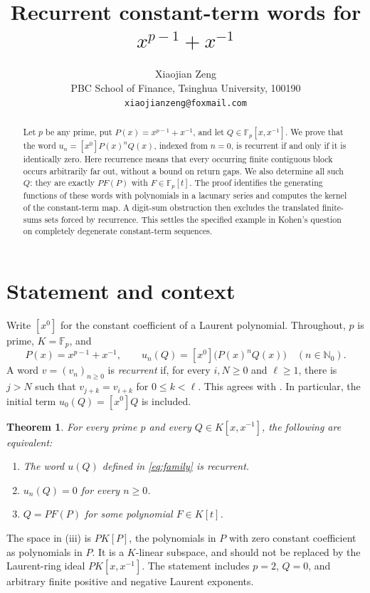 \documentclass[11pt]{article}
\title{Recurrent constant-term words for\\$x^{p-1}+x^{-1}$}
\author{Xiaojian Zeng\\
  \small PBC School of Finance, Tsinghua University, 100190\\
  \small\texttt{xiaojianzeng@foxmail.com}}
\date{}
\newtheorem{theorem}{Theorem}
\theoremstyle{remark}
\newcommand{\Nzero}{\mathbb N_0}
\newcommand{\Fp}{\mathbb F_p}
\begin{document}
\maketitle
\begin{abstract}
Let $p$ be any prime, put $P(x)=x^{p-1}+x^{-1}$, and let
$Q\in\Fp[x,x^{-1}]$. We prove that the word
$u_n=[x^0]P(x)^nQ(x)$, indexed from $n=0$, is recurrent if and only if it
is identically zero. Here recurrence means that every occurring finite
contiguous block occurs arbitrarily far out, without a bound on return gaps.
We also determine all such $Q$: they are exactly $P F(P)$ with
$F\in\Fp[t]$. The proof identifies the generating functions of these words
with polynomials in a lacunary series and computes the kernel of the
constant-term map. A digit-sum obstruction then excludes the translated
finite-sums sets forced by recurrence. This settles the specified example
in Kohen's question on completely degenerate constant-term sequences.
\end{abstract}

\section{Statement and context}

Write $[x^0]$ for the constant coefficient of a Laurent polynomial.
Throughout, $p$ is prime, $K=\Fp$, and
\begin{equation}\label{eq:family}
 P(x)=x^{p-1}+x^{-1},\qquad
 u_n(Q)=[x^0]\bigl(P(x)^nQ(x)\bigr)\quad(n\in\Nzero).
\end{equation}
A word $v=(v_n)_{n\geq0}$ is \emph{recurrent} if, for every
$i,N\geq0$ and $\ell\geq1$, there is $j>N$ such that
$v_{j+k}=v_{i+k}$ for $0\leq k<\ell$. This agrees with
\cite[Definition~18]{Kohen2026}. In particular, the initial term
$u_0(Q)=[x^0]Q$ is included.

\begin{theorem}\label{thm:main}
For every prime $p$ and every $Q\in K[x,x^{-1}]$, the following are equivalent:
\begin{enumerate}
\item[(i)] The word $u(Q)$ defined in \eqref{eq:family} is recurrent.
\item[(ii)] $u_n(Q)=0$ for every $n\geq0$.
\item[(iii)] $Q=P F(P)$ for some polynomial $F\in K[t]$.
\end{enumerate}
\end{theorem}

The space in (iii) is $P K[P]$, the polynomials in $P$ with zero constant
coefficient as polynomials in $P$. It is a $K$-linear subspace, and should
not be replaced by the Laurent-ring ideal $P K[x,x^{-1}]$.
The statement includes $p=2$, $Q=0$, and arbitrary finite positive and
negative Laurent exponents.
\end{document}
